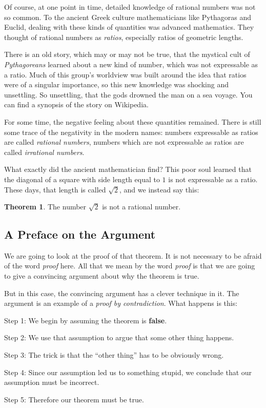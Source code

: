 \documentclass[12pt,letterpaper]{article}
\theoremstyle{definition}
\newtheorem{theorem}{Theorem}
\begin{document}
Of course, at one point in time, detailed knowledge of rational numbers was not so common. 
To the ancient Greek culture mathematicians like Pythagoras and Euclid, dealing with these kinds of quantities was advanced mathematics.
They thought of rational numbers as \emph{ratios}, especially ratios of geometric lengths.

There is an old story, which may or may not be true, that the mystical cult of \emph{Pythagoreans} learned about a new kind of number, which was not expressable as a ratio. 
Much of this group's worldview was built around the idea that ratios were of a singular importance, so this new knowledge was shocking and unsettling.
So unsettling, that the gods drowned the man on a sea voyage. 
You can find a synopsis of the story on Wikipedia\cite{wikipedia}.

For some time, the negative feeling about these quantities remained.
There is still some trace of the negativity in the modern names:
numbers expressable as ratios are called \emph{rational numbers}, numbers which are not expressable as ratios are called \emph{irrational numbers}.

What exactly did the ancient mathematician find?
This poor soul learned that the diagonal of a square with side length equal to $1$ is not expressable as a ratio.
These days, that length is called $\sqrt{2}$, and we instead say this:

\begin{theorem}
The number $\sqrt{2}$ is not a rational number.
\end{theorem}

\subsection*{A Preface on the Argument}

We are going to look at the proof of that theorem.
It is not necessary to be afraid of the word \emph{proof} here.
All that we mean by the word \emph{proof} is that we are going to give a convincing argument about why the theorem is true.

But in this case, the convincing argument has a clever technique in it.
The argument is an example of a \emph{proof by contradiction}. 
What happens is this:
\begin{compactdesc}
\item[Step 1:] We begin by assuming the theorem is \textbf{false}.
\item[Step 2:] We use that assumption to argue that some other thing happens.
\item[Step 3:] The trick is that the ``other thing'' has to be obviously wrong.
\item[Step 4:] Since our assumption led us to something stupid, we conclude that our assumption must be incorrect.
\item[Step 5:] Therefore our theorem must be true.
\end{compactdesc}
\end{document}
